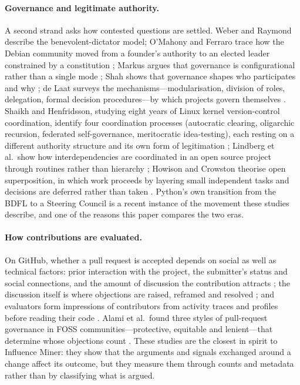 \documentclass[sigconf,screen]{acmart}
\begin{document}
\paragraph{Governance and legitimate authority.} A second strand asks how contested questions are settled. Weber \cite{weber2004} and Raymond \cite{raymond1999} describe the benevolent-dictator model; O'Mahony and Ferraro trace how the Debian community moved from a founder's authority to an elected leader constrained by a constitution \cite{omahony2007}; Markus argues that governance is configurational rather than a single mode \cite{markus2007}; Shah shows that governance shapes who participates and why \cite{shah2006}; de Laat surveys the mechanisms---modularisation, division of roles, delegation, formal decision procedures---by which projects govern themselves \cite{delaat2007}. Shaikh and Henfridsson, studying eight years of Linux kernel version-control coordination, identify four coordination processes (autocratic clearing, oligarchic recursion, federated self-governance, meritocratic idea-testing), each resting on a different authority structure and its own form of legitimation \cite{shaikh2017}; Lindberg et al.\ show how interdependencies are coordinated in an open source project through routines rather than hierarchy \cite{lindberg2016}; Howison and Crowston theorise open superposition, in which work proceeds by layering small independent tasks and decisions are deferred rather than taken \cite{howison2014}. Python's own transition from the BDFL to a Steering Council \cite{pep13} is a recent instance of the movement these studies describe, and one of the reasons this paper compares the two eras.

\paragraph{How contributions are evaluated.} On GitHub, whether a pull request is accepted depends on social as well as technical factors: prior interaction with the project, the submitter's status and social connections, and the amount of discussion the contribution attracts \cite{tsay2014}; the discussion itself is where objections are raised, reframed and resolved \cite{tsay2014b}; and evaluators form impressions of contributors from activity traces and profiles before reading their code \cite{marlow2013}. Alami et al.\ found three styles of pull-request governance in FOSS communities---protective, equitable and lenient---that determine whose objections count \cite{alami2020}. These studies are the closest in spirit to Influence Miner: they show that the arguments and signals exchanged around a change affect its outcome, but they measure them through counts and metadata rather than by classifying what is argued.
\end{document}
